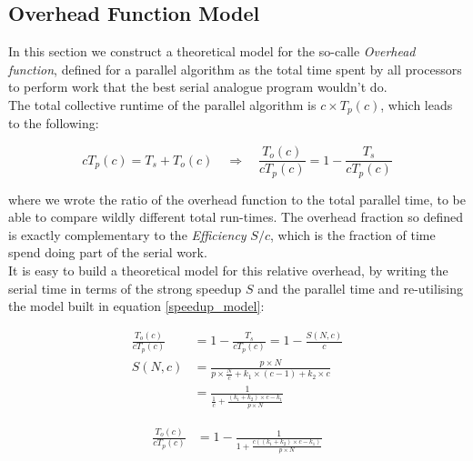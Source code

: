 \documentclass{article}
\begin{document}
\subsection{Overhead Function Model}

In this section we construct a theoretical model for the so-calle \textit{Overhead function}, defined for a parallel algorithm as the total time spent by all processors to perform work that the best serial analogue program wouldn't do.\\
The total collective runtime of the parallel algorithm is $c \times T_p\left( c \right)$, which leads to the following:

\begin{equation}\label{overhead_def}
c  T_p\left( c \right) = T_s + T_o\left( c \right) \quad \Rightarrow \quad \frac{T_o\left( c \right)}{cT_p\left( c \right)} = 1 - \frac{T_s}{cT_p\left( c \right) }
\end{equation} 

where we wrote the ratio of the overhead function to the total parallel time, to be able to compare wildly different total run-times. The overhead fraction so defined is exactly complementary to the \textit{Efficiency} $S/c$, which is the fraction of time spend doing part of the serial work.\\
It is easy to build a theoretical model for this relative overhead, by writing the serial time in terms of the strong speedup $S$ and the parallel time and re-utilising the model built in equation \ref{speedup_model}:

\begin{minipage}{0.5\linewidth}
\begin{equation*}
\begin{split}
\frac{T_o\left( c \right)}{cT_p\left( c \right)}& = 1 - \frac{T_s}{cT_p\left( c \right) } = 1 - \frac{S\left( N, c \right)}{c} \\
S \left( N, c \right) &=\frac{p\times N}{p \times \frac{N}{c} + k_1 \times \left( c - 1 \right) + k_2 \times c}  \\
&= \frac{1}{ \displaystyle \frac{1}{c} + \frac{\left( k_1  + k_2\right)\times c -  k_1 }{p\times N} } 
\end{split}
\end{equation*}
\end{minipage}
\begin{minipage}{0.5\linewidth}
\begin{equation}\label{overhead_model}
\begin{split}
\frac{T_o\left( c \right)}{cT_p\left( c \right)}& = 1 - \frac{1}{ \displaystyle 1 + \frac{c \left( \left( k_1  + k_2\right)\times c -  k_1 \right)}{p\times N}  }
\end{split}
\end{equation}
\end{minipage}
\end{document}
